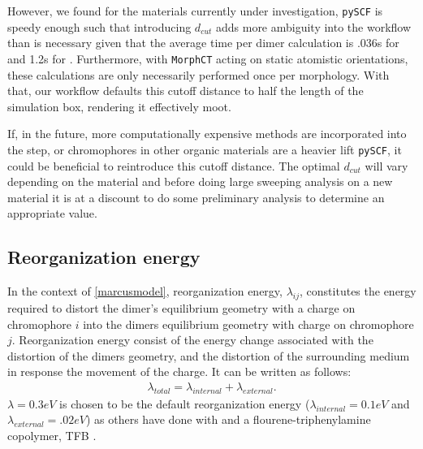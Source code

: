 However, we found for the materials currently under investigation,
\texttt{pySCF} is speedy enough such that introducing $d_{cut}$ adds more ambiguity
into the workflow than is necessary given that the average time per  dimer calculation is .036s for  and
1.2s for . Furthermore, with \texttt{MorphCT} acting on static atomistic orientations, these calculations 
are only necessarily performed once per morphology. With that, our workflow defaults this cutoff distance to half
the length of the simulation box, rendering it effectively moot. 

If, in the future, more computationally expensive methods are incorporated into the  step, or chromophores in other
organic materials are a heavier lift \texttt{pySCF}, it could be beneficial to reintroduce this cutoff distance. The optimal $d_{cut}$ will vary depending on the material and before doing large sweeping analysis on a new
material it is at a discount to do some preliminary analysis to determine an appropriate value.

\subsection{Reorganization energy}

In the context of \autoref{marcusmodel}, 
reorganization energy, $\lambda_{ij}$, constitutes the energy required to distort the dimer's equilibrium geometry with a
charge on chromophore $i$ into the dimers equilibrium geometry with charge on chromophore $j$.
Reorganization energy consist of the energy change associated with the distortion of the dimers geometry,
and the distortion of the surrounding medium in response the movement of the charge. It can be written as
follows:
\begin{align}
    \lambda_{total} = \lambda_{internal} + \lambda_{external}.
\end{align} 
$\lambda = 0.3eV$ is chosen to be the default reorganization energy ($\lambda_{internal} = 0.1eV$
and $\lambda_{external} = .02eV$) as others have done with  \cite{Jones2017} and
a flourene-triphenylamine copolymer, TFB \cite{Gali2017}. 

